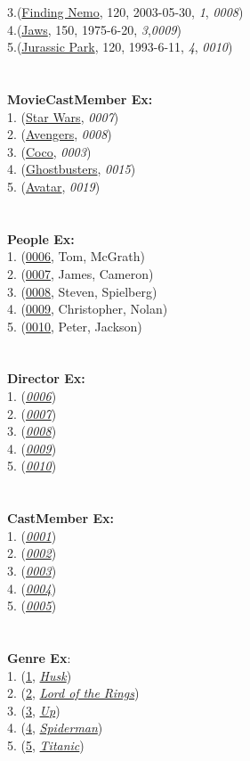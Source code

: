 \documentclass[12pt]{article}
\begin{document}
    3.(\underline{Finding Nemo}, 120, 2003-05-30, \emph{1}, \emph{0008})\\
    4.(\underline{Jaws}, 150, 1975-6-20, \emph{3},\emph{0009})\\
    5.(\underline{Jurassic Park}, 120, 1993-6-11, \emph{4}, \emph{0010})\\
    \\ \\
    \textbf{Movie\textunderscore Cast\textunderscore Member Ex:}\\
    1. (\underline{Star Wars}, \emph{0007})\\
    2. (\underline{Avengers}, \emph{0008})\\
    3. (\underline{Coco}, \emph{0003})\\
    4. (\underline{Ghostbusters}, \emph{0015})\\
    5. (\underline{Avatar}, \emph{0019})\\
    \\ \\
    \textbf{People Ex:}\\
    1. (\underline{0006}, Tom, McGrath)\\
    2. (\underline{0007}, James, Cameron)\\
    3. (\underline{0008}, Steven, Spielberg)\\
    4. (\underline{0009}, Christopher, Nolan)\\
    5. (\underline{0010}, Peter, Jackson)\\
    \\ \\
    \textbf{Director Ex:}\\
    1. (\underline{\emph{0006}})\\
    2. (\underline{\emph{0007}})\\
    3. (\underline{\emph{0008}})\\
    4. (\underline{\emph{0009}})\\
    5. (\underline{\emph{0010}})\\
    \\ \\
    \textbf{Cast\textunderscore Member Ex:} \\
    1. (\underline{\emph{0001}})\\
    2. (\underline{\emph{0002}})\\
    3. (\underline{\emph{0003}})\\
    4. (\underline{\emph{0004}})\\
    5. (\underline{\emph{0005}})\\
    \\ \\
    \textbf{Genre Ex}:\\
    1. (\underline{1}, \emph{\underline{Husk}})\\
    2. (\underline{2}, \emph{\underline{Lord of the Rings}})\\
    3. (\underline{3}, \emph{\underline{Up}})\\
    4. (\underline{4}, \emph{\underline{Spiderman}})\\
    5. (\underline{5}, \emph{\underline{Titanic}})\\
    \\ \\
\end{document}
